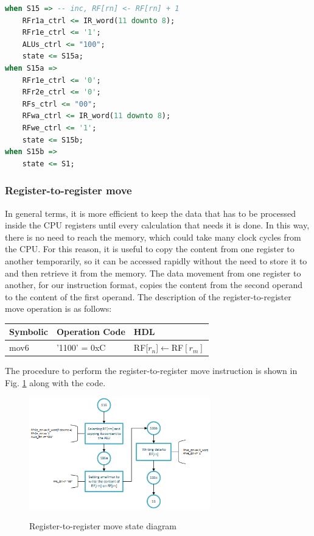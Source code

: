 \documentclass[]{article}
\begin{document}
\begin{lstlisting}[language=vhdl, caption={Increment state vhdl}, label={}]
when S15 =>	-- inc, RF[rn] <- RF[rn] + 1
	RFr1a_ctrl <= IR_word(11 downto 8);	
	RFr1e_ctrl <= '1'; 
	ALUs_ctrl <= "100";
	state <= S15a;
when S15a =>   
	RFr1e_ctrl <= '0';
	RFr2e_ctrl <= '0';
	RFs_ctrl <= "00";
	RFwa_ctrl <= IR_word(11 downto 8);
	RFwe_ctrl <= '1';
	state <= S15b;
when S15b =>  
	state <= S1;
\end{lstlisting}

\subsubsection{Register-to-register move}

In general terms, it is more efficient to keep the data that has to be processed inside the CPU registers until every calculation that needs it is done. In this way, there is no need to reach the memory, which could take many clock cycles from the CPU. For this reason, it is useful to copy the content from one register to another temporarily, so it can be accessed rapidly without the need to store it to and then retrieve it from the memory. The data movement from one register to another, for our instruction format, copies the content from the second operand to the content of the first operand. The description of the register-to-register move operation is as follows:
\begin{table}[h]
	\centering
	{
		\begin{tabular}{|p{3cm}|p{3cm}|p{3cm}|}
			\hline
			\textbf{Symbolic} & \textbf{Operation Code} & \textbf{HDL}                   \\ \hline
			mov6              & '1100' = 0xC            & RF[$r_n$]$\leftarrow$RF$[r_m]$ \\ \hline
		\end{tabular}
	}
\end{table}

The procedure to perform the register-to-register move instruction is shown in Fig. \ref{fig:5} along with the code.
\begin{figure}[H]
	\caption{Register-to-register move state diagram}
	\centering
	\includegraphics[width=0.7\textwidth]{mov6}
	\label{fig:5}
\end{figure}
\end{document}
